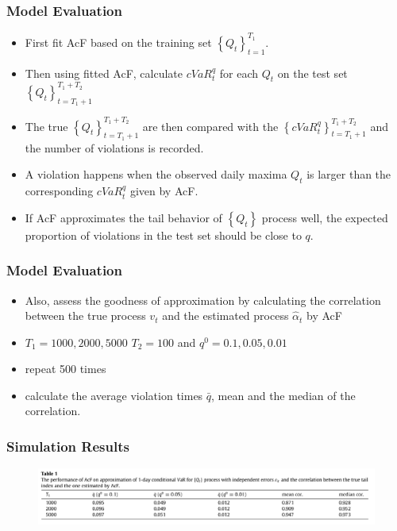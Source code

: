 \documentclass{beamer}
\newcommand{\set}[1]{\left\{#1\right\}}
\begin{document}
\begin{frame}
    \frametitle{Model Evaluation}
\begin{itemize}
    \item First fit AcF based on the training set $\set{Q_t}_{t=1}^{T_1}$.
    \medskip
    \item Then using fitted AcF, calculate $cVaR_t^q$ for each $Q_t$ on the test set $\set{Q_t}_{t=T_1+1}^{T_1+T_2}$
    \medskip
    \item The true $\set{Q_t}_{t=T_1+1}^{T_1+T_2}$ are then compared with the $\set{cVaR_t^q}_{t=T_1+1}^{T_1+T_2}$ and the number of violations is recorded.
    \medskip
    \item A violation happens when the observed daily maxima $Q_t$ is     larger than the corresponding $cVaR_t^q$ given by AcF.
    \medskip
    \item If AcF approximates the tail behavior of $\set{Q_t}$ process well, the expected proportion of violations in the test set should be close to $q$.
\end{itemize}
    
\end{frame}

\begin{frame}
    \frametitle{Model Evaluation}
    \begin{itemize}
        \item Also, assess the goodness of approximation by calculating the correlation between the true
        process $v_t$ and the estimated process $\hat{\alpha}_t$ by AcF
        \bigskip
        \item $T_1=1000,2000,5000$ $T_2=100$ and $q^0=0.1,0.05,0.01$
        \bigskip
        \item repeat 500 times
        \bigskip
        \item calculate the average violation times $\bar{q}$, mean and the median of the correlation.
    \end{itemize}

    

\end{frame}


\begin{frame}
    \frametitle{Simulation Results}
    \begin{figure}
        \includegraphics[width=01\textwidth]{table1.png}   
    \end{figure}
\end{frame}
\end{document}
